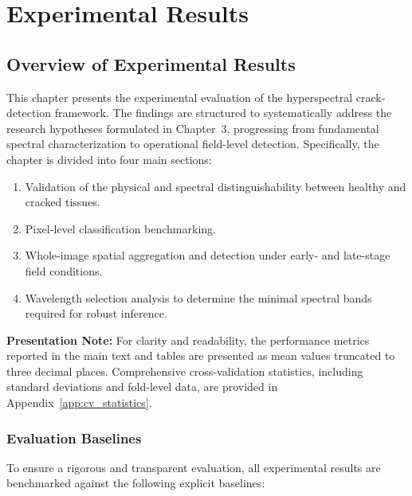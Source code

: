 ﻿\chapter{Experimental Results}
\label{ch:results}

\section{Overview of Experimental Results}

\noindent
This chapter presents the experimental evaluation of the hyperspectral crack-detection framework. The findings are structured to systematically address the research hypotheses formulated in Chapter~3, progressing from fundamental spectral characterization to operational field-level detection. Specifically, the chapter is divided into four main sections: 

\begin{enumerate}
    \item Validation of the physical and spectral distinguishability between healthy and cracked tissues.
    \item Pixel-level classification benchmarking.
    \item Whole-image spatial aggregation and detection under early- and late-stage field conditions.
    \item Wavelength selection analysis to determine the minimal spectral bands required for robust inference.
\end{enumerate}

\medskip
\noindent
\textbf{Presentation Note:} For clarity and readability, the performance metrics reported in the main text and tables are presented as mean values truncated to three decimal places. Comprehensive cross-validation statistics, including standard deviations and fold-level data, are provided in Appendix~\ref{app:cv_statistics}.

\clearpage
\subsection{Evaluation Baselines}
\label{subsec:results_baselines}

\noindent
To ensure a rigorous and transparent evaluation, all experimental results are benchmarked against the following explicit baselines:

